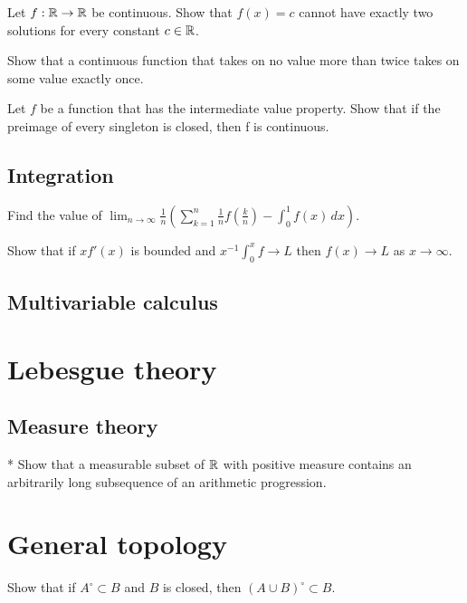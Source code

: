 \documentclass[11pt]{article}
\begin{document}
	\begin{prb}
	Let $f:\mathbb{R}\to\mathbb{R}$ be continuous. Show that $f(x)=c$ cannot have exactly two solutions for every constant $c\in\mathbb{R}$.
	\end{prb}

	\begin{prb}
	Show that a continuous function that takes on no value more than twice takes on some value exactly once.
	\end{prb}

	\begin{prb}
	Let $f$ be a function that has the intermediate value property. Show that if the preimage of every singleton is closed, then f is continuous.
	\end{prb}

	\subsection{Integration}
	\begin{prb}
	Find the value of $\lim_{n\to\infty}\frac1n\left(\sum_{k=1}^n\frac1nf\left(\frac kn\right)-\int_0^1f(x)\,dx\right)$.
	\end{prb}

	\begin{prb}
	Show that if $xf'(x)$ is bounded and $x^{-1}\int_0^xf\to L$ then $f(x)\to L$ as $x\to\infty$.
	\end{prb}

	\subsection{Multivariable calculus}




\section{Lebesgue theory}
	\subsection{Measure theory}
	\begin{prb}*
	Show that a measurable subset of $\mathbb{R}$ with positive measure contains an arbitrarily long subsequence of an arithmetic progression.
	\end{prb}


\section{General topology}
	\begin{prb}
	Show that if $A^\circ\subset B$ and $B$ is closed, then $(A\cup B)^\circ\subset B$.
	\end{prb}
\end{document}
